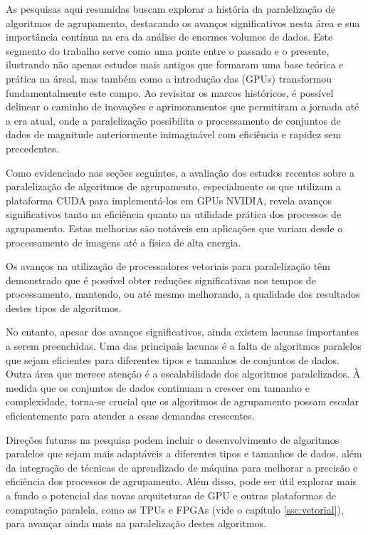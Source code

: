 \documentclass[12pt,
openright, 
oneside, %
a4paper,    %
brazil]{facom-ufu-abntex2}
\begin{document}
As pesquisas aqui resumidas buscam explorar a história da paralelização de algoritmos de agrupamento, destacando os avanços significativos nesta área e sua importância contínua na era da análise de enormes volumes de dados. Este segmento do trabalho serve como uma ponte entre o passado e o presente, ilustrando não apenas estudos mais antigos que formaram uma base teórica e prática na áreal, mas também como a introdução das (GPUs) transformou fundamentalmente este campo. Ao revisitar os marcos históricos, é possível delinear o caminho de inovações e aprimoramentos que permitiram a jornada até a era atual, onde a paralelização possibilita o processamento de conjuntos de dados de magnitude anteriormente inimaginável com eficiência e rapidez sem precedentes.


Como evidenciado nas seções seguintes, a avaliação dos estudos recentes sobre a paralelização de algoritmos de agrupamento, especialmente os que utilizam a plataforma CUDA para implementá-los em GPUs NVIDIA, revela avanços significativos tanto na eficiência quanto na utilidade prática dos processos de agrupamento. Estas melhorias são notáveis em aplicações que variam desde o processamento de imagens até a física de alta energia.

Os avanços na utilização de processadores vetoriais para paralelização têm demonstrado que é possível obter reduções significativas nos tempos de processamento, mantendo, ou até mesmo melhorando, a qualidade dos resultados destes tipos de algoritmos.

No entanto, apesar dos avanços significativos, ainda existem lacunas importantes a serem preenchidas. Uma das principais lacunas é a falta de algoritmos paralelos que sejam eficientes para diferentes tipos e tamanhos de conjuntos de dados. Outra área que merece atenção é a escalabilidade dos algoritmos paralelizados. À medida que os conjuntos de dados continuam a crescer em tamanho e complexidade, torna-se crucial que os algoritmos de agrupamento possam escalar eficientemente para atender a essas demandas crescentes.


Direções futuras na pesquisa podem incluir o desenvolvimento de algoritmos paralelos que sejam mais adaptáveis a diferentes tipos e tamanhos de dados, além da integração de técnicas de aprendizado de máquina para melhorar a precisão e eficiência dos processos de agrupamento. Além disso, pode ser útil explorar mais a fundo o potencial das novas arquiteturas de GPU e outras plataformas de computação paralela, como as TPUs e FPGAs (vide o capítulo \ref{ssc:vetorial}), para avançar ainda mais na paralelização destes algoritmos.
\end{document}
